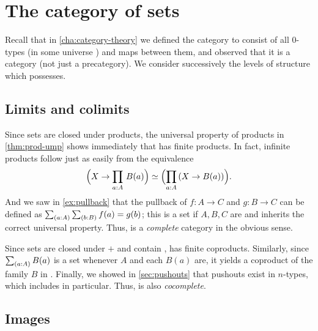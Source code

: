 \section{The category of sets}
\label{sec:piw-pretopos}

Recall that in \cref{cha:category-theory} we defined the category \uset to consist of all $0$-types (in some universe \UU) and maps between them, and observed that it is a category (not just a precategory).
We consider successively the levels of structure which \uset possesses.

\subsection{Limits and colimits}
\label{subsec:limits-sets}

%
%

Since sets are closed under products, the universal property of products in \cref{thm:prod-ump} shows immediately that \uset has finite products.
In fact, infinite products follow just as easily from the equivalence
\[ \Parens{X\to \prd{a:A} B(a)} \eqvsym \Parens{\prd{a:A} (X\to B(a))}.\]
And we saw in \cref{ex:pullback} that the pullback of $f:A\to C$ and $g:B\to C$ can be defined as $\sm{a:A}{b:B} f(a)=g(b)$; this is a set if $A,B,C$ are and inherits the correct universal property.
Thus, \uset is a \emph{complete} category in the obvious sense.
%
%

Since sets are closed under $+$ and contain \emptyt, \uset has finite coproducts.
Similarly, since $\sm{a:A}B(a)$ is a set whenever $A$ and each $B(a)$ are, it yields a coproduct of the family $B$ in \uset.
Finally, we showed in \cref{sec:pushouts} that pushouts exist in $n$-types, which includes \uset in particular.
Thus, \uset is also \emph{cocomplete}.
%
%

\subsection{Images}
\label{sec:image}

